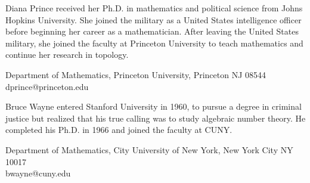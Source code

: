 \documentclass{article}
\theoremstyle{plain}
\theoremstyle{definition}
\begin{document}
\begin{biog}
\item[Diana Prince] received her Ph.D. in mathematics and political science from Johns Hopkins University. She joined the military as a United States intelligence officer before beginning her career as a mathematician.  After leaving the United States military, she joined the faculty at Princeton University to teach mathematics and continue her research in topology.
\begin{affil}
Department of Mathematics, Princeton University, Princeton NJ 08544\\
dprince@princeton.edu
\end{affil}

\item[Bruce Wayne] entered Stanford University in 1960, to pursue a degree in criminal justice but realized that his true calling was to study algebraic number theory.  He completed his Ph.D. in 1966 and joined the faculty at CUNY.
\begin{affil}
Department of Mathematics, City University of New York, New York City NY 10017\\
bwayne@cuny.edu
\end{affil}
\end{biog}
\vfill\eject
\end{document}
